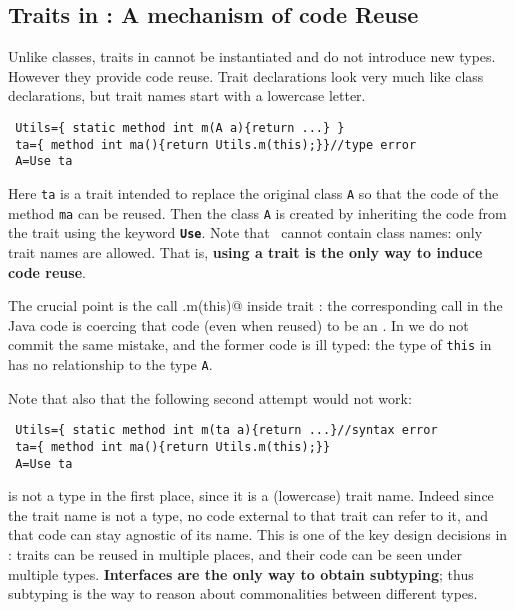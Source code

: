 \subsection{Traits in \name: A mechanism of code Reuse}

Unlike classes, traits in \name cannot be instantiated and do not introduce new
types. However they provide code reuse.
Trait declarations 
look very much like class declarations, but trait names 
start with a lowercase letter.

\saveSpace
\begin{lstlisting}
 Utils={ static method int m(A a){return ...} }
 ta={ method int ma(){return Utils.m(this);}}//type error
 A=Use ta
\end{lstlisting}
\saveSpace
\noindent Here \lstinline{ta} is a trait intended to replace the
original class \lstinline{A} so that the code of the method
\lstinline{ma} can be reused. Then the class \lstinline{A} 
is created by inheriting the code from the trait using the keyword 
{\bf \lstinline{Use}}. Note that \use\ cannot contain class names: only trait
names are allowed.
That is, \textbf{using a trait is the only way to induce code reuse}.

The crucial point is the call \Q@Utils.m(this)@ inside trait \Q@ta@:
the corresponding call in the Java code is coercing that code (even when reused) to be an \Q@A@.
In \name we do not commit the same mistake, and the former code is ill typed:
the type of \lstinline{this} in
\Q@ta@ has no relationship to the type \lstinline{A}.


Note that also that the following second attempt would not work:
\saveSpace
\begin{lstlisting}
 Utils={ static method int m(ta a){return ...}//syntax error
 ta={ method int ma(){return Utils.m(this);}}
 A=Use ta
\end{lstlisting}
\saveSpace
\Q@ta@ is not a type in the first place, since it is a (lowercase) trait name.
Indeed since the trait name is not a type, no code external to that trait can
refer to it, and that code can stay agnostic of its name. This is one of the key design decisions in \name:
traits can be reused in multiple places, and their code can be seen under multiple types.
\textbf{Interfaces are the only way to obtain subtyping}; thus
subtyping is the way to reason about commonalities between different types.

